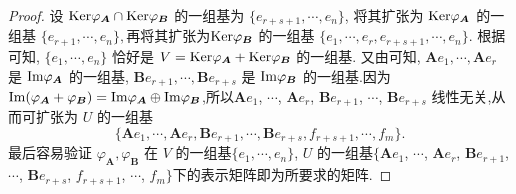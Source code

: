 \documentclass[../../main.tex]{subfiles}
\begin{document}
\begin{proof}
设 ${\rm Ker}\varphi_{\boldsymbol{A}} \cap {\rm Ker}\varphi_{\boldsymbol{B}}$ 的一组基为 $\{e_{r + s + 1}, \cdots, e_n\}$, 将其扩张为 ${\rm Ker}\varphi_{\boldsymbol{A}}$ 的一组基 $\{e_{r + 1},\cdots, e_n\},$再将其扩张为${\rm Ker}\varphi_{\boldsymbol{B}}$ 的一组基 $\{e_1,\cdots,e_r,e_{r+s+1},\cdots, e_n\}.$
根据可知, $\{e_1, \cdots, e_n\}$ 恰好是 $V = {\rm Ker}\varphi_{\boldsymbol{A}} + {\rm Ker}\varphi_{\boldsymbol{B}}$ 的一组基. 又由可知, $\boldsymbol{A}e_1, \cdots, \boldsymbol{A}e_r$ 是 ${\rm Im}\varphi_{\boldsymbol{A}}$ 的一组基, $\boldsymbol{B}e_{r + 1}, \cdots, \boldsymbol{B}e_{r + s}$ 是 ${\rm Im}\varphi_{\boldsymbol{B}}$ 的一组基.因为${\rm Im}(\varphi_{\boldsymbol{A}} + \varphi_{\boldsymbol{B}}) = {\rm Im}\varphi_{\boldsymbol{A}} \oplus {\rm Im}\varphi_{\boldsymbol{B}}$,所以$\boldsymbol{A}e_1$, $\cdots$, $\boldsymbol{A}e_r$, $\boldsymbol{B}e_{r + 1}$, $\cdots$, $\boldsymbol{B}e_{r + s}$ 线性无关,从而可扩张为 $U$ 的一组基 $$\{\boldsymbol{A}e_1,\cdots,\boldsymbol{A}e_r,\boldsymbol{B}e_{r + 1},\cdots, \boldsymbol{B}e_{r + s}, f_{r + s + 1}, \cdots, f_m\}.$$ 最后容易验证 $\varphi_{\boldsymbol{A}}, \varphi_{\boldsymbol{B}}$ 在 $V$ 的一组基$\{e_1, \cdots, e_n\}$, $U$ 的一组基$\{\boldsymbol{A}e_1$, $\cdots$, $\boldsymbol{A}e_r$, $\boldsymbol{B}e_{r + 1}$, $\cdots$, $\boldsymbol{B}e_{r + s}$, $f_{r + s + 1}$, $\cdots$, $f_m\}$下的表示矩阵即为所要求的矩阵.

\end{proof}
\end{document}
